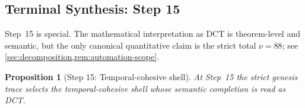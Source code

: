 \documentclass[11pt,a4paper]{article}
\theoremstyle{plain}
\newtheorem{proposition}[theorem]{Proposition}
\theoremstyle{definition}
\theoremstyle{remark}
\begin{document}
\subsection{Terminal Synthesis: Step 15}
\label{subsec:genesis-terminal-proof}

Step~15 is special.
The mathematical interpretation as DCT is theorem-level and semantic, but the
only canonical quantitative claim is the strict total $\nu=88$;
see \cref{sec:decomposition,rem:automation-scope}.

\begin{proposition}[Step 15: Temporal-cohesive shell]
\label{prop:genesis-step15}
At Step~15 the strict genesis trace selects the temporal-cohesive shell whose
semantic completion is read as DCT.
\end{proposition}
\end{document}
